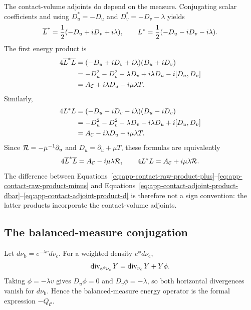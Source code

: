 The contact-volume adjoints do depend on the measure.  Conjugating scalar
coefficients and using $D_u^*=-D_u$ and $D_v^*=-D_v-\lambda$ yields
\[
 \overline L^*=\frac12(-D_u+iD_v+i\lambda),
 \qquad
 L^*=\frac12(-D_u-iD_v-i\lambda).
\]
The first energy product is
\begin{align}
 4\overline L^*\overline L
 &=(-D_u+iD_v+i\lambda)(D_u+iD_v)\notag\\
 &=-D_u^2-D_v^2-\lambda D_v
   +i\lambda D_u-i[D_u,D_v]\notag\\
 &=A_{\mathcal C}+i\lambda D_u-i\mu\lambda T.
 \label{eq:app-contact-adjoint-product-dbar}
\end{align}
Similarly,
\begin{align}
 4L^*L
 &=(-D_u-iD_v-i\lambda)(D_u-iD_v)\notag\\
 &=-D_u^2-D_v^2-\lambda D_v
   -i\lambda D_u+i[D_u,D_v]\notag\\
 &=A_{\mathcal C}-i\lambda D_u+i\mu\lambda T.
 \label{eq:app-contact-adjoint-product-d}
\end{align}
Since $\mathcal R=-\mu^{-1}\partial_u$ and
$D_u=\partial_u+\mu T$, these formulas are equivalently
\begin{equation}\label{eq:app-contact-adjoint-products-Reeb}
 4\overline L^*\overline L=A_{\mathcal C}-i\mu\lambda\mathcal R,
 \qquad
 4L^*L=A_{\mathcal C}+i\mu\lambda\mathcal R.
\end{equation}
The difference between
Equations~\eqref{eq:app-contact-raw-product-plus}--\eqref{eq:app-contact-raw-product-minus}
and
Equations~\eqref{eq:app-contact-adjoint-product-dbar}--\eqref{eq:app-contact-adjoint-product-d}
is therefore not a sign convention: the latter products incorporate the
contact-volume adjoints.

\subsection{The balanced-measure conjugation}

Let $d\nu_{\mathrm b}=e^{-\lambda v}d\nu_{\mathrm c}$.  For a weighted
density $e^\phi d\nu_{\mathrm c}$,
\begin{equation}\label{eq:app-weighted-divergence}
 \operatorname{div}_{e^\phi\nu_{\mathrm c}}Y
 =\operatorname{div}_{\nu_{\mathrm c}}Y+Y\phi.
\end{equation}
Taking $\phi=-\lambda v$ gives
$D_u\phi=0$ and $D_v\phi=-\lambda$, so both horizontal divergences vanish
for $d\nu_{\mathrm b}$.  Hence the balanced-measure energy operator is the
formal expression $-Q_{\mathcal C}$.

